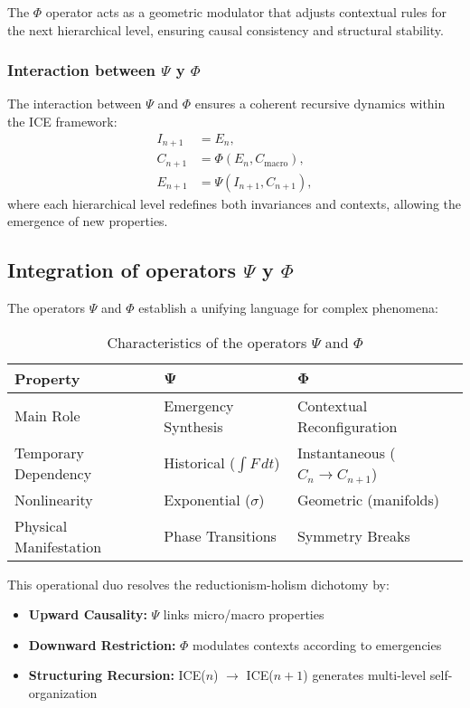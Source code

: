 \documentclass{article}
\begin{document}
The $\Phi$ operator acts as a geometric modulator that adjusts contextual rules for the next hierarchical level, ensuring causal consistency and structural stability.

\subsubsection{Interaction between \texorpdfstring{$\Psi$ y $\Phi$}{Psi y Phi}}
The interaction between $\Psi$ and $\Phi$ ensures a coherent recursive dynamics within the ICE framework:
\begin{align*}
    I_{n+1} &= E_n, \\
    C_{n+1} &= \Phi(E_n, C_{\text{macro}}), \\
    E_{n+1} &= \Psi(I_{n+1}, C_{n+1}),
\end{align*}
where each hierarchical level redefines both invariances and contexts, allowing the emergence of new properties.

\subsection{Integration of operators \texorpdfstring{$\Psi$ y $\Phi$}{Psi y Phi}}
The operators $\Psi$ and $\Phi$ establish a unifying language for complex phenomena:

\begin{table}[h!]
    \centering
    \begin{tabular}{|l|l|l|}
    \hline
\textbf{Property} & $\boldsymbol{\Psi}$ & $\boldsymbol{\Phi}$ \\
         \hline
         Main Role & Emergency Synthesis & Contextual Reconfiguration\\
         Temporary Dependency & Historical ($\int F \, dt$) & Instantaneous ($C_n \rightarrow C_{n+1}$)\\
        Nonlinearity & Exponential ($\sigma$) & Geometric (manifolds)\\
         Physical Manifestation & Phase Transitions & Symmetry Breaks \\
    \hline
         
    \end{tabular}
    \caption{Characteristics of the operators $\Psi$ and $\Phi$}
    \label{tab:my_label}
\end{table}
\noindent This operational duo resolves the reductionism-holism dichotomy by:

\begin{itemize}
    \item \textbf{Upward Causality:} $\Psi$ links micro/macro properties
    \item \textbf{Downward Restriction:} $\Phi$ modulates contexts according to emergencies
    \item \textbf{Structuring Recursion:} ICE($n$) $\rightarrow$ ICE($n+1$) generates multi-level self-organization
\end{itemize}
\end{document}
